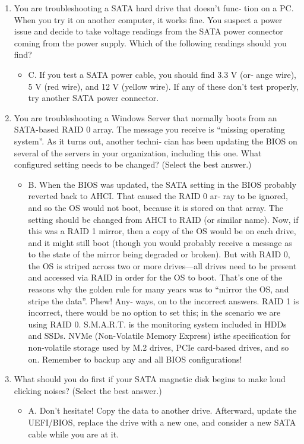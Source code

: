 \documentclass{article}
\begin{document}
\begin{enumerate}
    \item You are troubleshooting a SATA hard drive that doesn’t func‐
tion on a PC. When you try it on another computer, it works
fine. You suspect a power issue and decide to take voltage
readings from the SATA power connector coming from the
power supply. Which of the following readings should you
find?
    \begin{itemize}
        \item C. If you test a SATA power cable, you should find 3.3 V (or‐
ange wire), 5 V (red wire), and 12 V (yellow wire). If any of
these don’t test properly, try another SATA power connector.
    \end{itemize}
    \item You are troubleshooting a Windows Server that normally boots
from an SATA-based RAID 0 array. The message you receive
is “missing operating system”. As it turns out, another techni‐
cian has been updating the BIOS on several of the servers in
your organization, including this one. What configured setting
needs to be changed? (Select the best answer.)
    \begin{itemize}
        \item B. When the BIOS was updated, the SATA setting in the BIOS
probably reverted back to AHCI. That caused the RAID 0 ar‐
ray to be ignored, and so the OS would not boot, because it is
stored on that array. The setting should be changed from AHCI
to RAID (or similar name). Now, if this was a RAID 1 mirror,
then a copy of the OS would be on each drive, and it might still
boot (though you would probably receive a message as to the
state of the mirror being degraded or broken). But with RAID
0, the OS is striped across two or more drives—all drives need
to be present and accessed via RAID in order for the OS to
boot. That’s one of the reasons why the golden rule for many
years was to “mirror the OS, and stripe the data”. Phew! Any‐
ways, on to the incorrect answers. RAID 1 is incorrect, there
would be no option to set this; in the scenario we are using
RAID 0. S.M.A.R.T. is the monitoring system included in
HDDs and SSDs. NVMe (Non-Volatile Memory Express) isthe specification for non-volatile storage used by M.2 drives,
PCIe card-based drives, and so on. Remember to backup any
and all BIOS configurations!
    \end{itemize}
    \item What should you do first if your SATA magnetic disk begins
to make loud clicking noises? (Select the best answer.)
    \begin{itemize}
        \item A. Don’t hesitate! Copy the data to another drive. Afterward,
update the UEFI/BIOS, replace the drive with a new one, and
consider a new SATA cable while you are at it.
    \end{itemize}
\end{enumerate}
\end{document}
